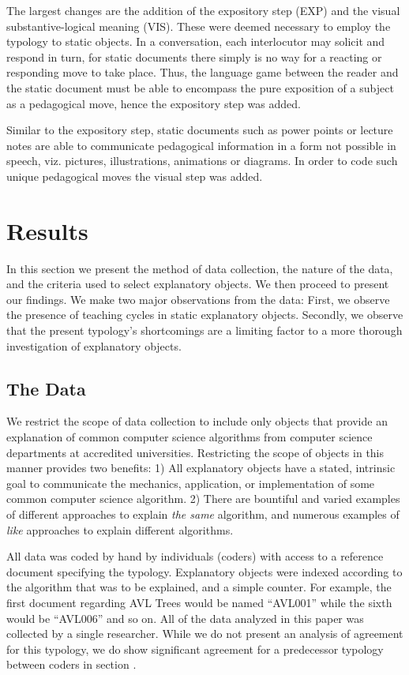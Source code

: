 \documentclass[conference]{IEEEtran}
\begin{document}
The largest changes are the addition of the expository step (EXP) and the visual
substantive-logical meaning (VIS). These were deemed necessary to employ the
typology to static objects. In a conversation, each interlocutor may solicit and
respond in turn, for static documents there simply is no way for a reacting or
responding move to take place. Thus, the language game between the reader and
the static document must be able to encompass the pure exposition of a subject
as a pedagogical move, hence the expository step was added.

Similar to the expository step, static documents such as power points or lecture
notes are able to communicate pedagogical information in a form not possible in
speech, viz. pictures, illustrations, animations or diagrams. In order to code
such unique pedagogical moves the visual step was added.

\section{Results}
In this section we present the method of data collection, the nature of the
data, and the criteria used to select explanatory objects. We then proceed to
present our findings. We make two major observations from the data: First,
we observe the presence of teaching cycles in static explanatory objects.
Secondly, we observe that the present typology's shortcomings are a limiting
factor to a more thorough investigation of explanatory objects.

\subsection{The Data}
We restrict the scope of data collection to include only objects that provide an
explanation of common computer science algorithms from computer
science departments at accredited universities. Restricting the scope of objects
in this manner provides two benefits: 1) All explanatory objects have a stated,
intrinsic goal to communicate the mechanics, application, or implementation of
some common computer science algorithm. 2) There are bountiful and varied
examples of different approaches to explain \emph{the same} algorithm, and numerous
examples of \emph{like} approaches to explain different algorithms.

All data was coded by hand by individuals (coders) with access to a reference
document specifying the typology. Explanatory objects were indexed according to
the algorithm that was to be explained, and a simple counter. For example, the
first document regarding AVL Trees would be named ``AVL001'' while the sixth
would be ``AVL006'' and so on. All of the data analyzed in this paper was
collected by a single researcher. While we do not present an analysis of
agreement for this typology, we do show significant agreement for a predecessor
typology between coders in section .
\end{document}
